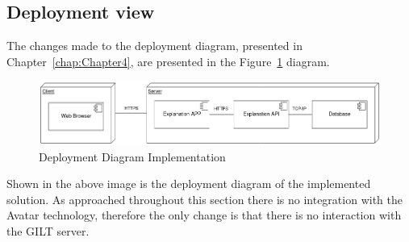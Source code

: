 \subsection{Deployment view}

The changes made to the deployment diagram, presented in Chapter~\ref{chap:Chapter4}, are presented in the Figure~\ref{fig:deployImp} diagram.

\begin{figure}[H]
\centering
\includegraphics[width=\textwidth,keepaspectratio]{ch5/assets/deployment_diagram_Implement.png}
\caption[Deployment Diagram Implementation]{Deployment Diagram Implementation}
\label{fig:deployImp}
\end{figure}

Shown in the above image is the deployment diagram of the implemented solution.
As approached throughout this section there is no integration with the Avatar technology, therefore the only change is that there is no interaction with the GILT server.
